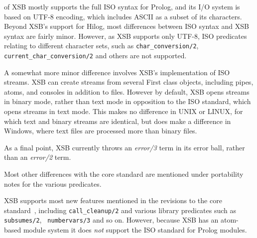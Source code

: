 \version{} of XSB mostly supports the full ISO syntax for Prolog, and
its I/O system is based on UTF-8 encoding, which includes ASCII as a
subset of its characters.  Beyond XSB's support for Hilog, most
differences between ISO syntax and XSB syntax are fairly minor.
However, as XSB supports only UTF-8, ISO predicates relating to
different character sets, such as {\tt char\_conversion/2}, {\tt
  current\_char\_conversion/2} and others are not supported.

A somewhat more minor difference involves XSB's implementation of ISO
streams.  XSB can create streams from several First class objects,
including pipes, atoms, and consoles in addition to files.  However by
default, XSB opens streams in binary mode, rather than text mode in
opposition to the ISO standard, which opens streams in text mode.
This makes no difference in UNIX or LINUX, for which text and binary
streams are identical, but does make a difference in Windows, where
text files are processed more than binary files.

As a final point, XSB currently throws an {\em error/3} term in its
error ball, rather than an {\em error/2} term. 


Most other differences with the core standard are mentioned under
portability notes for the various predicates.  


XSB supports most new features mentioned in the revisions to the core
standard~\cite{ISO-Revision}, including {\tt call\_cleanup/2} and
various library predicates such as {\tt subsumes/2}, {\tt
  numbervars/3} and so on.
However, because XSB has an atom-based module system it does {\em not}
support the ISO standard for Prolog modules.

